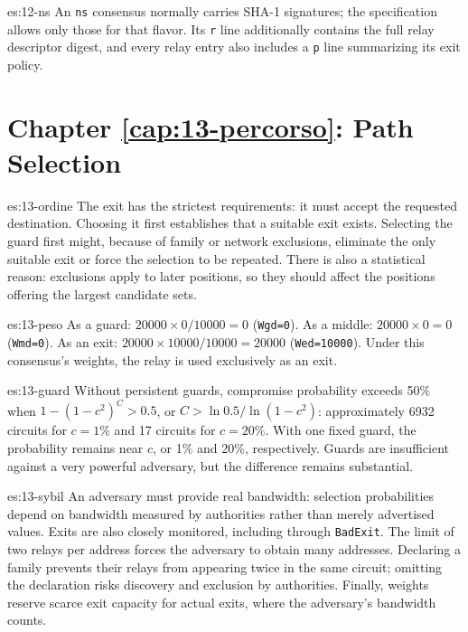 \begin{soluzione}{es:12-ns}
An \texttt{ns} consensus normally carries SHA-1 signatures; the specification allows only those for that flavor. Its \texttt{r} line additionally contains the full relay descriptor digest, and every relay entry also includes a \texttt{p} line summarizing its exit policy.
\end{soluzione}

\section*{Chapter \ref{cap:13-percorso}: Path Selection}

\begin{soluzione}{es:13-ordine}
The exit has the strictest requirements: it must accept the requested destination. Choosing it first establishes that a suitable exit exists. Selecting the guard first might, because of family or network exclusions, eliminate the only suitable exit or force the selection to be repeated. There is also a statistical reason: exclusions apply to later positions, so they should affect the positions offering the largest candidate sets.
\end{soluzione}

\begin{soluzione}{es:13-peso}
As a guard: $20000 \times 0/10000 = 0$ (\texttt{Wgd=0}). As a middle: $20000 \times 0 = 0$ (\texttt{Wmd=0}). As an exit: $20000 \times 10000/10000 = 20000$ (\texttt{Wed=10000}). Under this consensus's weights, the relay is used exclusively as an exit.
\end{soluzione}

\begin{soluzione}{es:13-guard}
Without persistent guards, compromise probability exceeds 50\% when $1 - (1 - c^2)^C > 0.5$, or $C > \ln 0.5 / \ln(1 - c^2)$: approximately \num{6932} circuits for $c = 1\%$ and 17 circuits for $c = 20\%$. With one fixed guard, the probability remains near $c$, or 1\% and 20\%, respectively. Guards are insufficient against a very powerful adversary, but the difference remains substantial.
\end{soluzione}

\begin{soluzione}{es:13-sybil}
An adversary must provide real bandwidth: selection probabilities depend on bandwidth measured by authorities rather than merely advertised values. Exits are also closely monitored, including through \texttt{BadExit}. The limit of two relays per address forces the adversary to obtain many addresses. Declaring a family prevents their relays from appearing twice in the same circuit; omitting the declaration risks discovery and exclusion by authorities. Finally, weights reserve scarce exit capacity for actual exits, where the adversary's bandwidth counts.
\end{soluzione}


